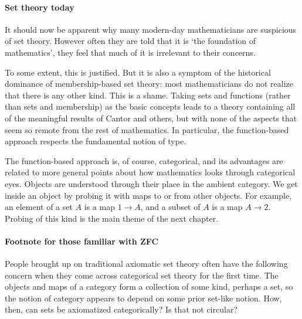 \paragraph*{Set theory today}
It should now be apparent why many modern-day mathematicians are suspicious
of set theory.  However often they are told that it is `the foundation%
%
%
of mathematics', they feel that much of it is irrelevant to their concerns.

To some extent, this is justified.  But it is also a symptom of the
historical dominance of membership-based set theory: most mathematicians do
not realize that there is any other kind.  This is a shame.  Taking sets
and functions (rather than sets and membership) as the basic concepts leads
to a theory containing all of the meaningful results of Cantor and others,
but with none of the aspects that seem so remote from the rest of
mathematics.  In particular, the function-based approach respects the
fundamental notion of type.%
%
%

The function-based approach is, of course, categorical, and its advantages
are related to more general points about how mathematics looks through
categorical eyes.  Objects are understood through their place in the
ambient category.  We get inside an object by probing%
%
%
it with maps to or from other objects.  For example, an element of a set
$A$ is a map $1 \to A$, and a subset of $A$ is a map $A \to 2$.  Probing of
this kind is the main theme of the next chapter.

\paragraph*{Footnote for those familiar with ZFC}  
People brought up on traditional axiomatic set theory often have the
following concern when they come across categorical set theory for the
first time.  The objects and maps of a category form a collection of some
kind, perhaps a set, so the notion of category appears to depend on some
prior set-like notion.  How, then, can sets be axiomatized categorically?
Is that not circular?

